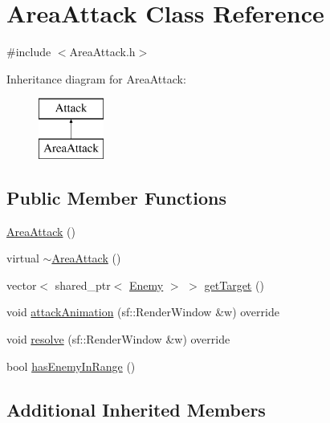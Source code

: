 \hypertarget{class_area_attack}{\section{Area\+Attack Class Reference}
\label{class_area_attack}
}


{\ttfamily \#include $<$Area\+Attack.\+h$>$}

Inheritance diagram for Area\+Attack\+:\begin{figure}[H]
\begin{center}
\leavevmode
\includegraphics[height=2.000000cm]{class_area_attack}
\end{center}
\end{figure}
\subsection*{Public Member Functions}
\begin{DoxyCompactItemize}
\item 
\hyperlink{class_area_attack_a02cc5e5bf2f6883f144f6ad5eba57db1}{Area\+Attack} ()
\item 
virtual \hyperlink{class_area_attack_aa1e868a7e1be4faff11efd88bab9aed8}{$\sim$\+Area\+Attack} ()
\item 
vector$<$ shared\+\_\+ptr$<$ \hyperlink{class_enemy}{Enemy} $>$ $>$ \hyperlink{class_area_attack_a028bc8efccb4cf22b9ceab22302f0c5a}{get\+Target} ()
\item 
void \hyperlink{class_area_attack_a1609522af5e5d2b93e2a48ece5f75f75}{attack\+Animation} (sf\+::\+Render\+Window \&w) override
\item 
void \hyperlink{class_area_attack_a959d58d03e60e0df7d33ceb14866a496}{resolve} (sf\+::\+Render\+Window \&w) override
\item 
bool \hyperlink{class_area_attack_a65a1e2c1cdfb5873354b6fed903c0e6a}{has\+Enemy\+In\+Range} ()
\end{DoxyCompactItemize}
\subsection*{Additional Inherited Members}


